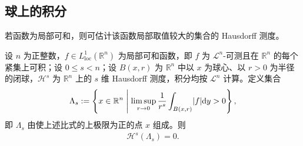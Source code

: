 \documentclass[../../main.tex]{subfiles}%
\begin{document}
\subsection{球上的积分}\label{subsection:ch02-04-3}

若函数为局部可和，则可估计该函数局部取值较大的集合的 Hausdorff 测度。

\begin{theorem}\label{theorem:ch02-2-10}
设 $n$ 为正整数，$f\in L^1_{\mathrm{loc}}(\mathbb{R}^n)$ 为局部可和函数，即 $f$ 为 $\mathcal{L}^n$-可测且在 $\mathbb{R}^n$ 的每个紧集上可积；设 $0\leqslant s<n$；设 $B(x,r)$ 为 $\mathbb{R}^n$ 中以 $x$ 为球心、以 $r>0$ 为半径的闭球，$\mathcal{H}^s$ 为 $\mathbb{R}^n$ 上的 $s$ 维 Hausdorff 测度，积分均按 $\mathcal{L}^n$ 计算。定义集合
\begin{align*}
\Lambda_s:=\left\{x\in\mathbb{R}^n\Biggm|\limsup_{r\to0}\frac{1}{r^s}\int_{B(x,r)}\lvert f\rvert\mathrm{d} y>0\right\},
\end{align*}
即 $\Lambda_s$ 由使上述比式的上极限为正的点 $x$ 组成。则
\begin{align*}
\mathcal{H}^s(\Lambda_s)=0 .
\end{align*}
\end{theorem}
\end{document}
